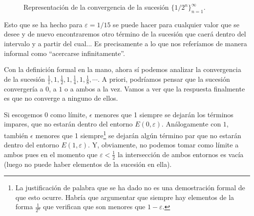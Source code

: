 \documentclass[10pt,a4paper,openright]{book}
\theoremstyle{break}
\begin{document}
\begin{figure}[h]
\centering
{}
\caption{Representación de la convergencia de la sucesión $\{1/2^n\}_{n=1}^\infty$.}
\label{fig:convergencia}
\end{figure}

Esto que se ha hecho para $\varepsilon= 1/15$ se puede hacer para cualquier valor que se desee y de nuevo encontraremos otro término de la sucesión que caerá dentro del intervalo y a partir del cual... Es precisamente a lo que nos referíamos de manera informal como ``acercarse infinitamente''.

Con la definición formal en la mano, ahora sí podemos analizar la convergencia de la sucesión $\frac{1}{1}, 1, \frac{1}{2}, 1, \frac{1}{4}, 1, \frac{1}{8}, \cdots $. A priori, podríamos pensar que la sucesión convergería a $0$, a $1$ o a ambos a la vez. Vamos a ver que la respuesta finalmente es que no converge a ninguno de ellos.

Si escogemos $0$ como límite, $\epsilon$ menores que 1 siempre se dejarán los términos impares, que no estarán dentro del entorno $E(0,\varepsilon)$. Análogamente con $1$, también $\epsilon$ menores que 1 siempre\footnote{La justificación de palabra que se ha dado no es una demostración formal de que esto ocurre. Habría que argumentar que siempre hay elementos de la forma $\frac{1}{2^n}$ que verifican que son menores que $1-\varepsilon$.} se dejarán algún término par que no estarán dentro del entorno $E(1,\varepsilon)$. Y, obviamente, no podemos tomar como límite a ambos pues en el momento que $\varepsilon < \frac{1}{2}$ la intersección de ambos entornos es vacía (luego no puede haber elementos de la sucesión en ella).
\end{document}
